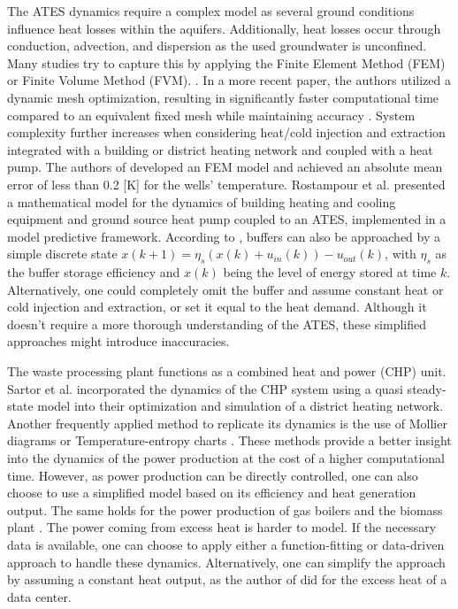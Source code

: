 The ATES dynamics require a complex model as several ground conditions influence heat losses within the aquifers. Additionally, heat losses occur through conduction, advection, and dispersion as the used groundwater is unconfined. Many studies try to capture this by applying the Finite Element Method (FEM) or Finite Volume Method (FVM). \cite{ZHOU2013240,GALGARO2013107,YAPPAROVA20141011}. In a more recent paper, the authors utilized a dynamic mesh optimization, resulting in significantly faster computational time compared to an equivalent fixed mesh while maintaining accuracy \cite{Salinas2022}. System complexity further increases when considering heat/cold injection and extraction integrated with a building or district heating network and coupled with a heat pump. The authors of \cite{BOZKAYA2017620} developed an FEM model and achieved an absolute mean error of less than 0.2 [K] for the wells' temperature. Rostampour et al. \cite{TAMASRostampour} presented a mathematical model for the dynamics of building heating and cooling equipment and ground source heat pump coupled to an ATES, implemented in a model predictive framework. According to \cite{YvoPutter}, buffers can also be approached by a simple discrete state $x(k+1) = \eta_s(x(k) + u_{in}(k)) - u_{out}(k)$, with $\eta_{s}$ as the buffer storage efficiency and $x(k)$ being the level of energy stored at time $k$.  Alternatively, one could completely omit the buffer and assume constant heat or cold injection and extraction, or set it equal to the heat demand. Although it doesn't require a more thorough understanding of the ATES, these simplified approaches might introduce inaccuracies. 

The waste processing plant functions as a combined heat and power (CHP) unit. Sartor et al. \cite{SARTOR2014474} incorporated the dynamics of the CHP system using a quasi steady-state model into their optimization and simulation of a district heating network. Another frequently applied method to replicate its dynamics is the use of Mollier diagrams or Temperature-entropy charts \cite{Laakkonen2017}. These methods provide a better insight into the dynamics of the power production at the cost of a higher computational time. However, as power production can be directly controlled, one can also choose to use a simplified model based on its efficiency and heat generation output. The same holds for the power production of gas boilers and the biomass plant \cite{Talebi,Tamasboilers}. The power coming from excess heat is harder to model. If the necessary data is available, one can choose to apply either a function-fitting or data-driven approach to handle these dynamics. Alternatively, one can simplify the approach by assuming a constant heat output, as the author of \cite{Spruit2020} did for the excess heat of a data center.

